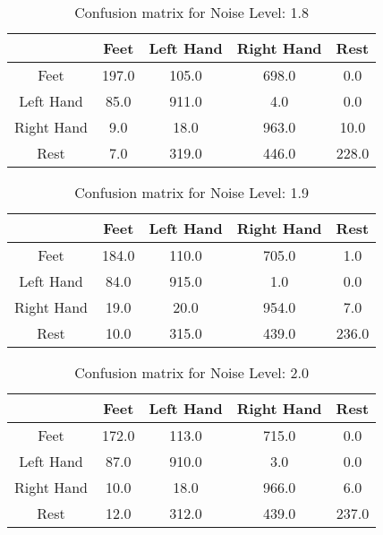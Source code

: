 \begin{table}[!htbp]
    \centering
    \begin{tabular}{|c||c|c|c|c|}
        \hline
		 & Feet & Left Hand & Right Hand & Rest \\
        \hline
        \hline
        Feet & 197.0 & 105.0 & 698.0 & 0.0 \\
        \hline
        Left Hand & 85.0 & 911.0 & 4.0 & 0.0 \\
        \hline
        Right Hand & 9.0 & 18.0 & 963.0 & 10.0 \\
        \hline
        Rest & 7.0 & 319.0 & 446.0 & 228.0 \\
        \hline
    \end{tabular}
    \caption{Confusion matrix for Noise Level: 1.8}
\end{table}

\begin{table}[!htbp]
    \centering
    \begin{tabular}{|c||c|c|c|c|}
        \hline
		 & Feet & Left Hand & Right Hand & Rest \\
        \hline
        \hline
        Feet & 184.0 & 110.0 & 705.0 & 1.0 \\
        \hline
        Left Hand & 84.0 & 915.0 & 1.0 & 0.0 \\
        \hline
        Right Hand & 19.0 & 20.0 & 954.0 & 7.0 \\
        \hline
        Rest & 10.0 & 315.0 & 439.0 & 236.0 \\
        \hline
    \end{tabular}
    \caption{Confusion matrix for Noise Level: 1.9}
\end{table}

\begin{table}[!htbp]
    \centering
    \begin{tabular}{|c||c|c|c|c|}
        \hline
		 & Feet & Left Hand & Right Hand & Rest \\
        \hline
        \hline
        Feet & 172.0 & 113.0 & 715.0 & 0.0 \\
        \hline
        Left Hand & 87.0 & 910.0 & 3.0 & 0.0 \\
        \hline
        Right Hand & 10.0 & 18.0 & 966.0 & 6.0 \\
        \hline
        Rest & 12.0 & 312.0 & 439.0 & 237.0 \\
        \hline
    \end{tabular}
    \caption{Confusion matrix for Noise Level: 2.0}
\end{table}

